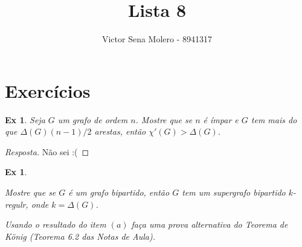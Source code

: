 \documentclass[12pt]{article}
\newcounter{exCounter}
\newtheorem{ex}[exCounter]{Ex}
\begin{document}
 
 
\title{Lista 8}
\author{Victor Sena Molero - 8941317}
\maketitle

\section{Exercícios}
\begin{ex}
Seja $G$ um grafo de ordem $n$. Mostre que se $n$ é ímpar e $G$ tem mais do que $\Delta(G)(n-1)/2$ arestas, então $\chi'(G) > \Delta(G)$.
\end{ex}

\begin{proof}[Resposta]
Não sei :(
\end{proof}

\begin{ex}
\begin{enumitem}[label=(\alph*)]
    \item Mostre que se $G$ é um grafo bipartido, então $G$ tem um supergrafo bipartido $k$-regulr, onde $k = \Delta(G)$.
    \item Usando o resultado do item $(a)$ faça uma prova alternativa do Teorema de König (Teorema 6.2 das Notas de Aula).
\end{enumitem}
\end{ex}
\end{document}
